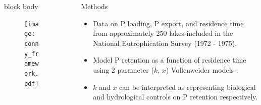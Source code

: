 \documentclass[final,hyperref={pdfpagelabels=false}]{beamer}
\begin{document}
\begin{frame}[t]
\begin{columns}[t]
\begin{column}{.465\textwidth}
{\begin{beamercolorbox}[wd=\textwidth,rounded=true]{block body}
\begin{figure}
  \texttt{[image: conny\_framework.pdf]}
\end{figure}

\end{beamercolorbox}
}


\end{column} %

\begin{column}{.03\textwidth}\end{column} %
 
\begin{column}{.465\textwidth} %

\begin{block}{Methods}

\begin{itemize}
\item Data on P loading, P export, and residence time from approximately 250 lakes included in the National Eutrophication Survey (1972 - 1975)\cite{StachelekNationalEutrophicationSurvey2017}.
\vspace{1em}
\item Model P retention as a function of residence time using 2 parameter ($k$, $x$) Vollenweider models \cite{Brettreviewreassessmentlake2007}. 
\vspace{1em}
\item $k$ and $x$ can be interpreted as representing biological and hydrological controls on P retention respectively.

\end{itemize}


\end{block}
\end{column}
\end{columns}
\end{frame}
\end{document}
